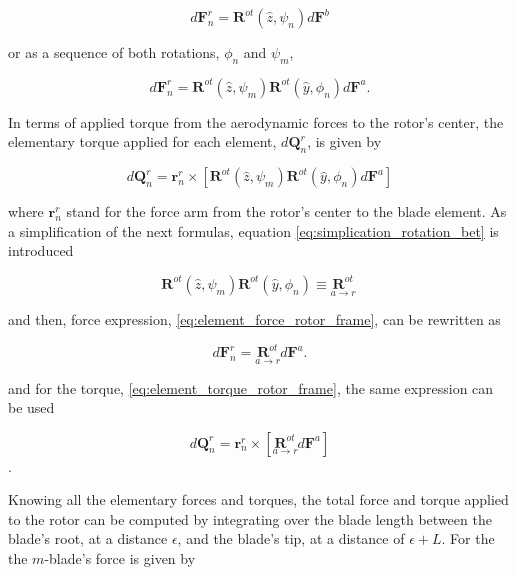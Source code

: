 \begin{equation}
    d\mathbf{F}^r_n = \boldsymbol{R}^{ot}(\hat{z}, \psi_n) d\mathbf{F}^b
\end{equation}

or as a sequence of both rotations, $\phi_n$ and $\psi_m$,

\begin{equation}
    d\mathbf{F}^r_n = \boldsymbol{R}^{ot}(\hat{z}, \psi_m) \boldsymbol{R}^{ot}(\hat{y}, \phi_n) d\mathbf{F}^a.
    \label{eq:element_force_rotor_frame}
\end{equation}

In terms of applied torque from the aerodynamic forces to the rotor's center, the elementary torque applied for each element, $d\mathbf{Q}^r_n$, is given by 

\begin{equation}
    d\mathbf{Q}^r_n = \mathbf{r}^r_n \times \left[ \boldsymbol{R}^{ot}(\hat{z}, \psi_m) \boldsymbol{R}^{ot}(\hat{y}, \phi_n) d\mathbf{F}^a \right] 
    \label{eq:element_torque_rotor_frame}
\end{equation}

where $\mathbf{r}^r_n$ stand for the force arm from the rotor's center to the blade element. As a simplification of the next formulas, equation  \ref{eq:simplication_rotation_bet} is introduced

\begin{equation}
    \boldsymbol{R}^{ot}(\hat{z}, \psi_m) \boldsymbol{R}^{ot}(\hat{y}, \phi_n) \equiv \underset{a \to r}{\boldsymbol{R}^{ot}}\
    \label{eq:simplication_rotation_bet}
\end{equation}

and then, force expression, \ref{eq:element_force_rotor_frame}, can be rewritten as

\begin{equation}
    d\mathbf{F}^r_n = \underset{a \to r}{\boldsymbol{R}^{ot}} d\mathbf{F}^a.
    \label{eq:element_force_rotor_frame_simplified}
\end{equation}

and for the torque, \ref{eq:element_torque_rotor_frame}, the same expression can be used

\begin{equation}
    d\mathbf{Q}^r_n = \mathbf{r}^r_n \times \left[ \underset{a \to r}{\boldsymbol{R}^{ot}}  d\mathbf{F}^a \right] 
    \label{eq:element_torque_rotor_frame_simplified}
\end{equation}.

Knowing all the elementary forces and torques, the total force and torque applied to the rotor can be computed by integrating over the blade length between the blade's root, at a distance $\epsilon$, and the blade's tip, at a distance of $\epsilon + L$. For the the $m$-blade's force is given by

